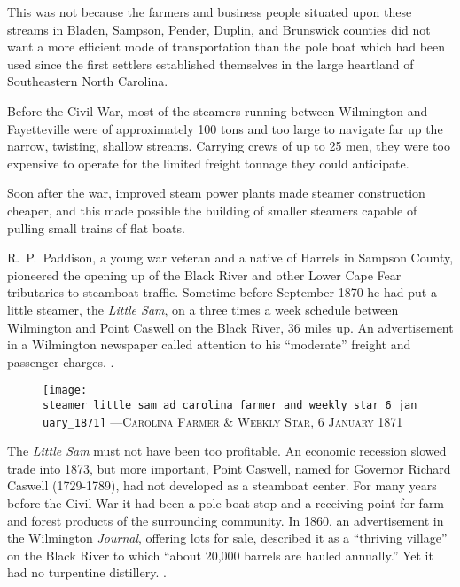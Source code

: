 \documentclass[11pt, a5paper, openright]{book}
\newcommand{\steamer}[1]{\textit{#1}\index{#1,~steamer}}
\begin{document}
This was not because the farmers and business people situated upon
these streams in Bladen, Sampson, Pender, Duplin, and Brunswick
counties did not want a more efficient mode of transportation than the
pole boat which had been used since the first settlers established
themselves in the large heartland of Southeastern North Carolina.\par

Before the Civil War, most of the steamers running between Wilmington
and Fayetteville were of approximately 100 tons and too large to
navigate far up the narrow, twisting, shallow streams.  Carrying crews
of up to 25 men, they were too expensive to operate for the limited
freight tonnage they could anticipate.\par

Soon after the war, improved steam power plants made steamer
construction cheaper, and this made possible the building of smaller
steamers capable of pulling small trains of flat boats.\par

R.~P.~Paddison, a young war veteran and a
native of Harrels in Sampson County, pioneered the opening up of the
Black River and other Lower Cape Fear tributaries to steamboat
traffic.  Sometime before September 1870 he had put a little steamer,
the \steamer{Little Sam}, on a three times a week schedule between
Wilmington and Point Caswell on the Black River, 36 miles up.  An
advertisement in a Wilmington newspaper called attention to his
``moderate'' freight and passenger charges.
\citep[9-21-1870]{ws}.\par

\begin{figure}[]
  \centering
  \texttt{[image: steamer\_little\_sam\_ad\_carolina\_farmer\_and\_weekly\_star\_6\_january\_1871]}\newline
  \textsc{---Carolina Farmer \& Weekly Star, 6 January 1871}
\end{figure}

The \steamer{Little Sam} must not have been too profitable.  An
economic recession slowed trade into 1873, but more important, Point
Caswell, named for Governor Richard Caswell (1729-1789), had not %
developed as a steamboat center.  For many years before the Civil War
it had been a pole boat stop and a receiving point for farm and forest
products of the surrounding community.  In 1860, an advertisement in
the Wilmington \textit{Journal}, offering lots for sale, described it
as a ``thriving village'' on the Black River to which ``about 20,000
barrels are hauled annually.''  Yet it had no turpentine distillery.
\citep[4-2-1860]{wj}.\par
\end{document}
